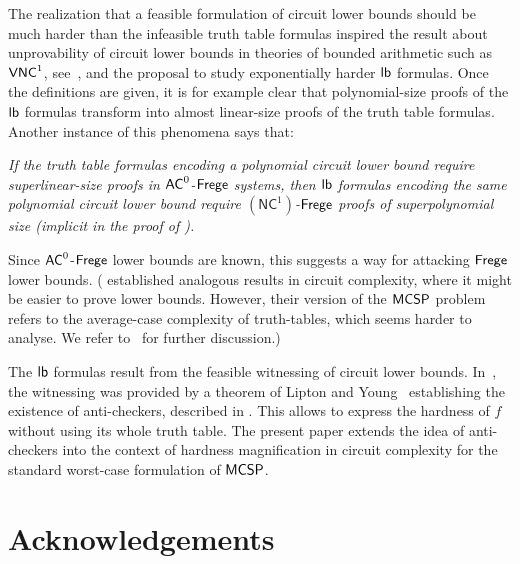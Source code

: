 \documentclass{toc}
\newcommand{\VNC}{\ensuremath{{\sf VNC}^1}\xspace}
\newcommand{\Frege}{\ensuremath{{\sf Frege}}\xspace}
\newcommand{\AC}{\ensuremath{{\sf AC}^0}\xspace}
\newcommand{\MCSP}{\ensuremath{{\sf MCSP}}\xspace}
\newcommand{\lb}{\ensuremath{{\sf lb}}\xspace}
\begin{document}
The realization that a feasible formulation of circuit lower bounds should be much harder than the infeasible truth table formulas inspired the result about unprovability of circuit lower bounds in theories of bounded arithmetic such as \VNC, see~\cite{Pclba}, and the proposal \cite[0.1 Circuit lower bounds and Complexity-Theoretic tautologies]{Pthesis} to study exponentially harder \lb formulas. 
Once the definitions are given, it is for example clear that polynomial-size proofs of the \lb formulas transform into almost linear-size proofs of the truth table formulas. Another instance of this phenomena says that:

\vspace{0.1cm}

\smallskip
\noindent \emph{If the truth table formulas encoding a polynomial circuit lower bound require superlinear-size proofs in \AC-\Frege systems, then \lb formulas encoding the same polynomial circuit lower bound require $(\mathsf{NC}^1)$-\Frege proofs of superpolynomial size \emph{(implicit in the proof of} \emph{\cite[Proposition 4.14]{DBLP:journals/eccc/MullerP17}}\emph{)}.}
\smallskip


\vspace{0.1cm}



\noindent Since \AC-\Frege lower bounds are known, this suggests a way for attacking \Frege lower bounds. (\cite{OS18} established analogous results in circuit complexity, where it might be easier to prove lower bounds. However, their version of the \MCSP problem refers to the average-case complexity of truth-tables, which seems harder to analyse. We refer to~\cite{OS18} for further discussion.)


The \lb formulas result from the feasible witnessing of circuit lower bounds. In~\cite{DBLP:journals/eccc/MullerP17}, the witnessing was provided by a theorem of Lipton and Young~\cite{DBLP:conf/stoc/LiptonY94} establishing the existence of anti-checkers, described in . This allows to express the hardness of $f$ without using its whole truth table. The present paper extends the idea of anti-checkers into the context of hardness magnification in circuit complexity for the standard worst-case formulation of \MCSP. 




\section*{Acknowledgements}
\end{document}
